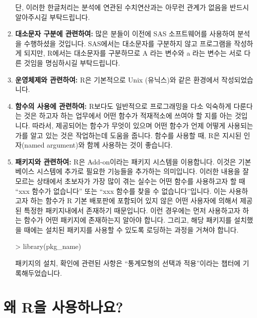 \documentclass{book}
\begin{document}
\begin{enumerate}
단, 이러한 한글처리는 분석에 연관된 수치연산과는 아무런 관계가 없음을 반드시 알아주시길 부탁드립니다.


	\item \textbf{대소문자 구분에 관련하여:}
많은 분들이 이전에 SAS 소프트웨어를 사용하여 분석을 수행하셨을 것입니다.
SAS에서는 대소문자를 구분하지 않고 프로그램을 작성하게 되지만, R에서는 대소문자를 구분하므로 A 라는 변수와 a 라는 변수는 서로 다른 것임을 명심하시길 부탁드립니다. 


	\item \textbf{운영체제와 관련하여:}
R은 기본적으로 Unix (유닉스)와 같은 환경에서 작성되었습니다. 


	\item \textbf{함수의 사용에 관련하여:}  R보다도 일반적으로 프로그래밍을 다소 익숙하게 다룬다는 것은 하고자 하는 업무에서 어떤 함수가 적재적소에 쓰여야 할 지를 아는 것입니다. 
	따라서, 제공되어는 함수가 무엇이 있으며 어떤 함수가 언제 어떻게 사용되는가를 알고 있는 것은 작업하는데 도움을 줍니다. 
	함수를 사용할 때,  R은 지시된 인자(named argument)와 함께 사용하는 것이 좋습니다.  


	\item \textbf{패키지와 관련하여: }
R은 Add-on이라는 패키지 시스템을 이용합니다. 
이것은 기본 베이스 시스템에 추가로 필요한 기능들을 추가하는 의미입니다.
이러한 내용을 잘 모르는 상태에서 초보자가 가장 많이 겪는 실수는 어떤 함수를 사용하고자 할 때 ``xxx 함수가 없습니다'' 또는 ``xxx 함수를 찾을 수 없습니다''입니다.
이는 사용하고자 하는 함수가 R 기본 배포판에 포함되어 있지 않은 어떤 사용자에 의해서 제공된 특정한 패키지내에서 존재하기 때문입니다.
이런 경우에는 먼저 사용하고자 하는 함수가 어떤 패키지에 존재하는지 알아야 합니다.  
그리고, 해당 패키지를 설치했을 때에는 설치된 패키지를 사용할 수 있도록 로딩하는 과정을 거쳐야 합니다.

\begin{Schunk}
\begin{Soutput}
> library(pkg_name)	
\end{Soutput}
\end{Schunk}

패키지의 설치, 확인에 관련된 사항은 ``통계모형의 선택과 적용''이라는 챕터에 기록해두었습니다. 

\end{enumerate}



\section{왜 R을 사용하나요?}
\end{document}
